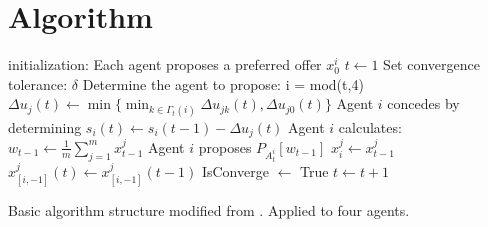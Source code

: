 \section{Algorithm}
\begin{algorithm}[h]
	initialization: Each agent proposes a preferred offer $x^i_0$\;
	$t\leftarrow1$\;
	Set convergence tolerance: $\delta$\;
	{
		Determine the agent to propose: i = mod(t,4)\;
		{
			{
				{
					$\Delta u_j(t)\leftarrow \min \{\min_{k\in\Gamma_t(i)}\Delta u_{jk}(t), \Delta u_{j0}(t)\}$\;	
				}
				Agent $i$ concedes by determining $s_i(t)\leftarrow s_i(t-1)-\Delta u_j(t)$\;
				Agent $i$ calculates: $w_{t-1}\leftarrow \frac{1}{m}\sum_{j=1}^{m}x^j_{t-1}$\;
				Agent $i$ proposes $P_{A^i_t}[w_{t-1}]$\;
			}{
				$x^j_i \leftarrow x^j_{t-1}$\;
				$x^j_{[i,-1]}(t) \leftarrow x^j_{[i,-1]}(t-1)$\;
			}
		}
		{
			IsConverge $\leftarrow $ True\;
		}{
			$t \leftarrow t+1$\;
		}
	}
\caption{Basic algorithm structure modified from \citep{zheng2015automated}. Applied to four agents.}
\end{algorithm}

\todos
